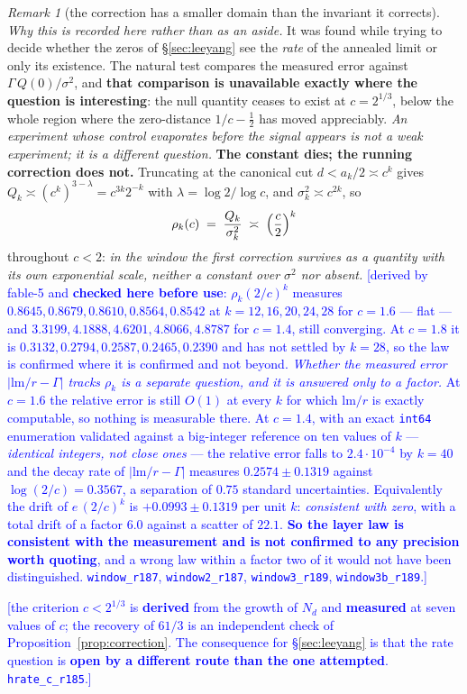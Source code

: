 \documentclass[11pt,a4paper]{article}
\theoremstyle{plain}
\theoremstyle{definition}
\theoremstyle{remark}
\newtheorem{remark}[theorem]{Remark}
\newcommand{\STATUS}[1]{\textcolor{blue}{\textsf{[#1]}}}
\begin{document}
\begin{remark}[the correction has a smaller domain than the invariant it corrects]
\emph{Why this is recorded here rather than as an aside.} It was found while trying to decide
whether the zeros of \S\ref{sec:leeyang} see the \emph{rate} of the annealed limit or only its
existence. The natural test compares the measured error against $\Gamma\,Q(0)/\sigma^{2}$, and
\textbf{that comparison is unavailable exactly where the question is interesting}: the null
quantity ceases to exist at $c=2^{1/3}$, below the whole region where the zero-distance
$1/c-\tfrac12$ has moved appreciably. \emph{An experiment whose control evaporates before the
signal appears is not a weak experiment; it is a different question.}
\medskip
\noindent
\textbf{The constant dies; the running correction does not.} Truncating at the canonical cut
$d<a_k/2\asymp c^{k}$ gives $Q_k\asymp(c^{k})^{3-\lambda}=c^{3k}2^{-k}$ with
$\lambda=\log2/\log c$, and $\sigma_k^{2}\asymp c^{2k}$, so
\[
  \rho_k(c)\;=\;\frac{Q_k}{\sigma_k^{2}}\;\asymp\;\Bigl(\frac{c}{2}\Bigr)^{k}
\]
throughout $c<2$: \emph{in the window the first correction survives as a quantity with its own
exponential scale, neither a constant over $\sigma^{2}$ nor absent.}
\STATUS{derived by fable-5 and \textbf{checked here before use}: $\rho_k(2/c)^{k}$ measures
$0.8645,0.8679,0.8610,0.8564,0.8542$ at $k=12,16,20,24,28$ for $c=1.6$ --- flat --- and
$3.3199,4.1888,4.6201,4.8066,4.8787$ for $c=1.4$, still converging. At $c=1.8$ it is
$0.3132,0.2794,0.2587,0.2465,0.2390$ and has not settled by $k=28$, so the law is confirmed
where it is confirmed and not beyond. \emph{Whether the measured error $|\mathrm{lm}/r-\Gamma|$
tracks $\rho_k$ is a separate question, and it is answered only to a factor.} At $c=1.6$ the
relative error is still $O(1)$ at every $k$ for which $\mathrm{lm}/r$ is exactly computable, so
nothing is measurable there. At $c=1.4$, with an exact \texttt{int64} enumeration validated
against a big-integer reference on ten values of $k$ --- \emph{identical integers, not close
ones} --- the relative error falls to $2.4\cdot10^{-4}$ by $k=40$ and the decay rate of
$|\mathrm{lm}/r-\Gamma|$ measures $0.2574\pm0.1319$ against $\log(2/c)=0.3567$, a separation of
$0.75$ standard uncertainties. Equivalently the drift of $e\,(2/c)^{k}$ is $+0.0993\pm0.1319$
per unit $k$: \emph{consistent with zero}, with a total drift of a factor $6.0$ against a
scatter of $22.1$. \textbf{So the layer law is consistent with the measurement and is not
confirmed to any precision worth quoting}, and a wrong law within a factor two of it would not
have been distinguished. \texttt{window\_r187}, \texttt{window2\_r187}, \texttt{window3\_r189},
\texttt{window3b\_r189}.}

\STATUS{the criterion $c<2^{1/3}$ is \textbf{derived} from the growth of $N_d$ and
\textbf{measured} at seven values of $c$; the recovery of $61/3$ is an independent check of
Proposition~\ref{prop:correction}. The consequence for \S\ref{sec:leeyang} is that the rate
question is \textbf{open by a different route than the one attempted}. \texttt{hrate\_c\_r185}.}
\end{remark}
\end{document}
